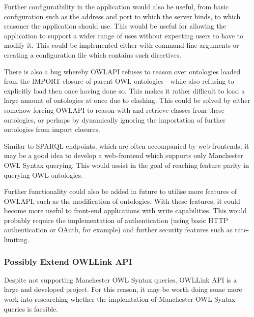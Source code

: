 \documentclass{article}
\begin{document}
Further configuratbility in the application would also be useful, from basic
configuration such as the address and port to which the server binds, to which
reasoner the application should use. This would be useful for allowing the
application to support a wider range of uses without expecting users to have to
modify it. This could be implemented either with command line arguments or
creating a configuration file which contains such directives.

There is also a bug whereby OWLAPI refuses to reason over ontologies loaded from
the IMPORT closure of parent OWL ontologies - while also refusing to explicitly
load then once having done so. This makes it rather difficult to load a large
amount of ontologies at once due to clashing. This could be solved by either
somehow forcing OWLAPI to reason with and retrieve classes from these
ontologies, or perhaps by dynamically ignoring the importation of further
ontologies from import closures.

Similar to SPARQL endpoints, which are often accompanied by web-frontends, it
may be a good idea to develop a web-frontend which supports only Manchester OWL
Syntax querying. This would assist in the goal of reaching feature parity in
querying OWL ontologies.

Further functionality could also be added in future to utilise more features of
OWLAPI, such as the modification of ontologies. With these features, it could
become more useful to front-end applications with write capabilities. This would
probably require the implementation of authentication (using basic HTTP
authentication or OAuth, for example) and further security features such as rate-limiting.

\subsubsection{Possibly Extend OWLLink API}

Despite not supporting Manchester OWL Syntax queries, OWLLink API is a large and
developed project. For this reason, it may be worth doing some
more work into researching whether the implemtation of Manchester OWL Syntax
queries is faesible.
\end{document}
